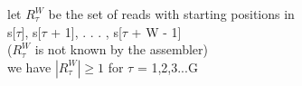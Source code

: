 \documentclass[preview]{standalone}
\begin{document}
\begin{center}
let $R^W_{\tau}$  be the set of reads with starting positions in\\ s[$\tau$], s[$\tau$ + 1], . . . , s[$\tau$ + W - 1] \\($R^W_{\tau}$ is not known by the assembler)\\ we have $|R^W_{\tau}| \ge 1$ for $\tau$ = 1,2,3...G
\end{center}
\end{document}
